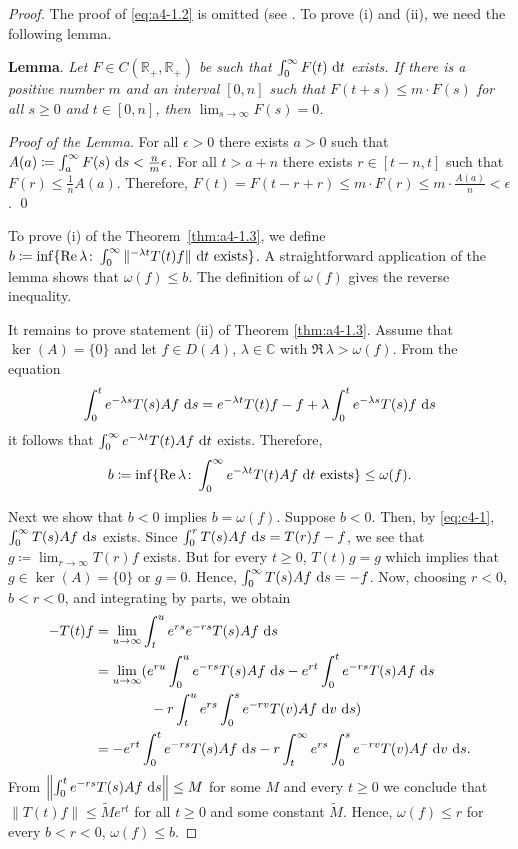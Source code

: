 \begin{proof}  The proof of \eqref{eq:a4-1.2} is omitted (see \citet[p.306]{hillephillips:1957}. 
To prove (i) and (ii), we need the following lemma.

\bigskip
\noindent
{\bf Lemma}. 
\label{lem:a4-1.3}
{\it Let $F \in C(\mathbb{R}_{+},\mathbb{R}_{+})$ be such that $\int_{0}^{\infty} F(t) \,\mathop{}\!\mathrm{d}{t}$ exists. 
If there is a positive number $m$ and an interval $[0,n]$ such that $F(t + s) \leq m \cdot F(s)$ for all $s \geq 0$ and $t \in [0,n]$, then $\lim_{s \to \infty} F(s) = 0$.}

\medskip\noindent
\textit{Proof of the Lemma}. 
For all $\epsilon > 0$ there exists $a > 0$ such that $A(a) \coloneqq \int_{a}^{\infty} F(s) \,\mathop{}\!\mathrm{d}{s} < \frac{n}{m}\epsilon$.
For all $t > a+n$ there exists $r \in [t-n,t]$ such that $F(r) \leq \frac{1}{n}A(a)$.
Therefore, $F(t) = F(t-r+r) \leq m \cdot F(r) \leq m \cdot \frac{A(a)}{n} < \epsilon$. 
\qed

\medskip\noindent
To prove (i) of the Theorem~\ref{thm:a4-1.3}, we define $b \coloneqq \inf\{\mathop{}\!\mathrm{Re}\,\lambda\colon\int_{0}^{\infty} \|^{-\lambda t} T(t)f\| \,\mathop{}\!\mathrm{d}{t} \text{ exists}\}$. 
A straightforward application of the lemma shows that $\omega(f) \leq b$.
The definition of $\omega(f)$ gives the reverse inequality.

It remains to prove statement (ii) of Theorem \ref{thm:a4-1.3}.
Assume that $\ker(A) = \{0\}$ and let $f \in D(A)$, $\lambda \in \mathbb{C}$ with $\Re\,\lambda > \omega(f)$. 
From the equation
\[
\int_{0}^{t} e^{-\lambda s} T(s)Af \,\mathop{}\!\mathrm{d}{s} = e^{-\lambda t}T(t)f - f + \lambda \int_{0}^{t} e^{-\lambda s} T(s)f \,\mathop{}\!\mathrm{d}{s}
\]
it follows that $\int_{0}^{\infty} e^{-\lambda t} T(t)Af \,\mathop{}\!\mathrm{d}{t}$ exists. 
Therefore, 
\[b \coloneqq \inf\{\mathop{}\!\mathrm{Re}\,\lambda\colon\int_{0}^{\infty} e^{-\lambda t}T(t)Af \,\mathop{}\!\mathrm{d}{t} \text{ exists}\} \leq \omega(f).\]



Next we show that $b < 0$ implies $b = \omega(f)$. 
Suppose $b < 0$. 
Then, by \eqref{eq:c4-1}, $\int_{0}^{\infty} T(s)Af \,\mathop{}\!\mathrm{d}{s}$ exists. 
Since $\int_{0}^{r} T(s)Af \,\mathop{}\!\mathrm{d}{s} = T(r)f - f$, we see that $g \coloneqq\lim_{r \to \infty} T(r)f$ exists. 
But for every $t \geq 0$, $T(t)g = g$ which implies that $g \in \ker(A) = \{0\}$ or $g = 0$. 
Hence, $\int_{0}^{\infty} T(s)Af \,\mathop{}\!\mathrm{d}{s} = -f$.
Now, choosing $r < 0$, $b < r < 0$, and integrating by parts, we obtain
\begin{align*}
-T(t)f &= \lim_{u \to \infty} \int_{t}^{u} e^{r s} e^{-r s} T(s)Af \,\ds\\
&= \lim_{u \to \infty} ( e^{ru}\int_0^ue^{-rs} T(s)Af \,\ds - e^{rt}\int_0^te^{-rs} T(s)Af \,\ds\\ 
& \qquad \qquad -r\int_t^u e^{rs}\int_0^s e^{-rv} T(v)Af\,\diff{v} \,\ds
) \\
&= - e^{rt}\int_0^te^{-rs} T(s)Af \,\ds -r\int_t^\infty e^{rs}\int_0^s e^{-rv} T(v)Af\,\diff{v} \,\ds.
\end{align*}
From $\left\|\int_{0}^{t} e^{-r s} T(s)Af \,\mathop{}\!\mathrm{d}{s}\right\| \leq M$ for some $M$ and every $t \geq 0$ we conclude that $\|T(t)f\| \leq \tilde{M}e^{rt}$ for all $t \geq 0$ and some constant $\tilde{M}$.
Hence, $\omega(f) \leq r$ for every $b < r < 0$, \ie $\omega(f) \leq b$.


\end{proof}
